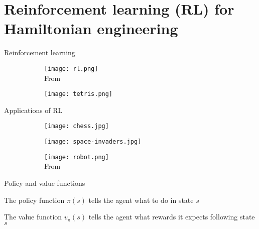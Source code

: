 \documentclass{beamer}
\begin{document}
\section{Reinforcement learning (RL) for Hamiltonian engineering}

\begin{frame}{Reinforcement learning}

\begin{figure}
\centering
\begin{subfigure}{.59\textwidth}
    \centering
    \texttt{[image: rl.png]} \\
    From \cite{sutton2018reinforcement}
\end{subfigure}
\begin{subfigure}{.39\textwidth}
    \centering
    \texttt{[image: tetris.png]}
\end{subfigure}
\end{figure}


\end{frame}


\begin{frame}{Applications of RL}
%


\begin{figure}
\centering
\begin{subfigure}{.54\textwidth}
    \centering
    \texttt{[image: chess.jpg]}
\end{subfigure}
\begin{subfigure}{.44\textwidth}
    \centering
    \texttt{[image: space-invaders.jpg]}
\end{subfigure}
\begin{subfigure}{.49\textwidth}
    \centering
    \texttt{[image: robot.png]} \\
    From \cite{gu2016deep}
\end{subfigure}

\end{figure}

\end{frame}


\begin{frame}{Policy and value functions}

The policy function $\pi(s)$ tells the agent what to do in state $s$

The value function $v_\pi(s)$ tells the agent what rewards it expects following state $s$

\end{frame}
\end{document}
